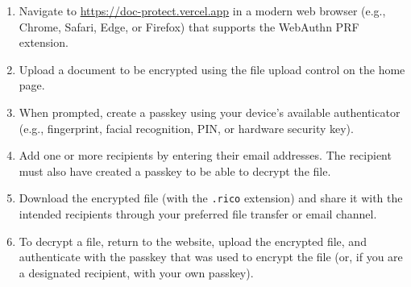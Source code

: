 \begin{enumerate}
    \item Navigate to \url{https://doc-protect.vercel.app} in a modern web browser (e.g., Chrome, Safari, Edge, or Firefox) that supports the WebAuthn PRF extension.
    \item Upload a document to be encrypted using the file upload control on the home page.
    \item When prompted, create a passkey using your device's available authenticator (e.g., fingerprint, facial recognition, PIN, or hardware security key).
    \item Add one or more recipients by entering their email addresses. The recipient must also have created a passkey to be able to decrypt the file.
    \item Download the encrypted file (with the \texttt{.rico} extension) and share it with the intended recipients through your preferred file transfer or email channel.
    \item To decrypt a file, return to the website, upload the encrypted file, and authenticate with the passkey that was used to encrypt the file (or, if you are a designated recipient, with your own passkey).
\end{enumerate}
